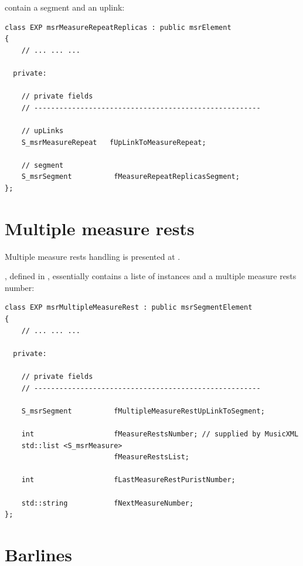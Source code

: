  contain a segment and an uplink:
\begin{lstlisting}[language=CPlusPlus]
class EXP msrMeasureRepeatReplicas : public msrElement
{
	// ... ... ...

  private:

    // private fields
    // ------------------------------------------------------

    // upLinks
    S_msrMeasureRepeat   fUpLinkToMeasureRepeat;

    // segment
    S_msrSegment          fMeasureRepeatReplicasSegment;
};
\end{lstlisting}


\section{Multiple measure rests}\label{Multiple measure rests}

Multiple measure rests handling is presented at .

, defined in , essentially contains a liste of  instances and a multiple measure rests number:
\begin{lstlisting}[language=CPlusPlus]
class EXP msrMultipleMeasureRest : public msrSegmentElement
{
	// ... ... ...

  private:

    // private fields
    // ------------------------------------------------------

    S_msrSegment          fMultipleMeasureRestUpLinkToSegment;

    int                   fMeasureRestsNumber; // supplied by MusicXML
    std::list <S_msrMeasure>
                          fMeasureRestsList;

    int                   fLastMeasureRestPuristNumber;

    std::string           fNextMeasureNumber;
};
\end{lstlisting}


\section{Barlines}\label{Barlines}


